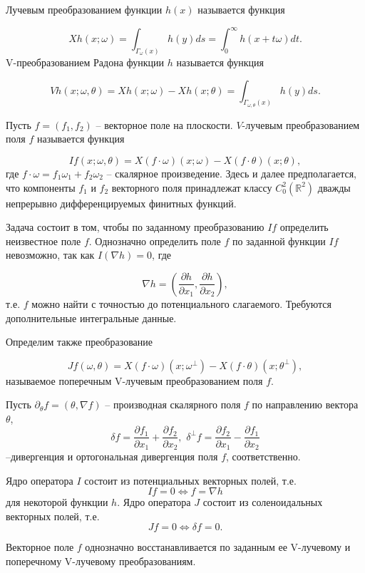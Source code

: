 Лучевым преобразованием функции $h(x)$ называется функция

$$Xh(x;\omega)=\int_{\Gamma_\omega (x)} h(y)ds=\int_0^\infty h(x+t\omega)dt.$$
V-преобразованием Радона функции $h$ называется функция

$$Vh(x;\omega,\theta)=Xh(x;\omega)-Xh(x;\theta)=\int_{\Gamma_{\omega,\theta}(x)} h(y)ds.$$

Пусть $f=(f_1,f_2 )$ -- векторное поле на плоскости. $V$-лучевым преобразованием поля $f$ называется функция

$$If(x;\omega,\theta)=X(f\cdot\omega)(x;\omega)-X(f\cdot\theta)(x;\theta),$$
где $f\cdot\omega=f_1 \omega_1+f_2 \omega_2$ -- скалярное произведение. Здесь и далее предполагается, что компоненты $f_1$ и $f_2$ векторного поля принадлежат классу $C_0^2 (\mathbb R^2 )$ дважды непрерывно дифференцируемых финитных функций.


Задача состоит в том, чтобы по заданному преобразованию $If$ определить неизвестное поле $f$. Однозначно определить поле $f$ по заданной функции $If$ невозможно, так как $I(\nabla h)=0$, где 

$$\nabla h=\left(\frac{\partial h}{\partial x_1},\frac{\partial h}{\partial x_2}\right),$$
т.е. $f$ можно найти с точностью до потенциального слагаемого. Требуются дополнительные интегральные данные.

Определим также преобразование

$$Jf(\omega,\theta)=X(f\cdot \omega)(x;\omega^\bot )-X(f\cdot\theta)(x;\theta^\bot),$$
называемое поперечным V-лучевым преобразованием поля $f$.

Пусть $\partial_\theta f=(\theta,\nabla f)$ -- производная скалярного поля $f$ по направлению вектора $\theta$, 
$$\delta f=\frac{\partial f_1}{\partial x_1}+\frac{\partial f_2}{\partial x_2},\,\, \delta^\bot f=\frac{\partial f_2}{\partial x_1}-\frac{\partial f_1}{\partial x_2}$$
--дивергенция и ортогональная дивергенция поля $f$, соответственно.


\begin{theorem} Ядро оператора $I$ состоит из потенциальных векторных полей, т.е.
$$If=0 \Leftrightarrow f=\nabla h$$ 
для некоторой функции $h$.
Ядро оператора $J$ состоит из соленоидальных векторных полей, т.е.
$$Jf=0  \Leftrightarrow  \delta f=0.$$
\end{theorem}

\begin{theorem} Векторное поле $f$ однозначно восстанавливается по заданным ее V-лучевому и поперечному V-лучевому преобразованиям.
\end{theorem}


